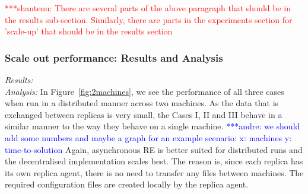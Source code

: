 \documentclass{rspublic}
\newcommand{\jhanote}[1]{ {\textcolor{red} { ***shantenu: #1 }}}
\newcommand{\alnote}[1]{ {\textcolor{blue} { ***andre: #1 }}}
\newcommand{\alnote}[1]{}
\newcommand{\jhanote}[1]{}
\begin{document}
\jhanote{There are several parts of the above paragraph that should be
  in the results sub-section. Similarly, there are parts in the
  experiments section for 'scale-up' that should be in the results
  section}

\subsubsection{Scale out performance: Results and Analysis}

{\it Results:}\\


{\it Analysis: } In Figure~\ref{fig:2machines}, we see the performance
of all three cases when run in a distributed manner across two
machines. As the data that is exchanged between replicas is very
small, the Cases I, II and III behave in a similar manner to the way
they behave on a single machine. \alnote{we should add some numbers
  and maybe a graph for an example scenario: x: machines y:
  time-to-solution} Again, asynchronous RE is better suited for
distributed runs and the decentralised implementation scales best. The
reason is, since each replica has its own replica agent, there is no
need to transfer any files between machines. The required
configuration files are created locally by the replica agent.
\end{document}
